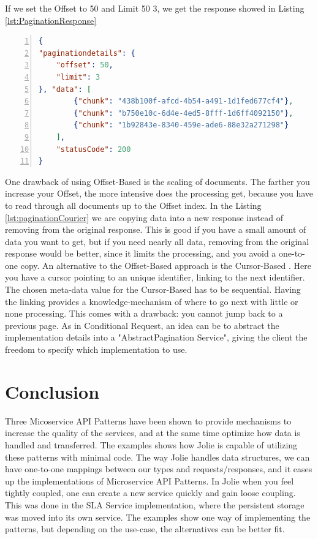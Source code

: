 \documentclass[12pt]{article}
\begin{document}
If we set the Offset to 50 and Limit 50 3, we get the response showed in Listing \ref{lst:PaginationResponse}

\begin{lstlisting}[caption=The response to the client based on Offset and Limit meta-data, 
    captionpos=b, language=json, label={lst:PaginationResponse}, numbers=left]
{
"paginationdetails": {
    "offset": 50,
    "limit": 3
}, "data": [
        {"chunk": "438b100f-afcd-4b54-a491-1d1fed677cf4"},
        {"chunk": "b750e10c-6d4e-4ed5-8fff-1d6ff4092150"},
        {"chunk": "1b92843e-8340-459e-ade6-88e32a271298"}
    ],
    "statusCode": 200
}
\end{lstlisting}

One drawback of using Offset-Based is the scaling of documents. The farther you increase your Offset, the more intensive does the processing get, because you have to read through all documents up to the Offset index. In the Listing \ref{lst:paginationCourier} we are copying data into a new response instead of removing from the original response. This is good if you have a small amount of data you want to get, but if you need nearly all data, removing from the original response would be better, since it limits the processing, and you avoid a one-to-one copy. An alternative to the Offset-Based approach is the Cursor-Based \cite{CursorBased}. Here you have a cursor pointing to an unique identifier, linking to the next identifier. The chosen meta-data value for the Cursor-Based has to be sequential. Having the linking provides a knowledge-mechanism of where to go next with little or none processing. This comes with a drawback: you cannot jump back to a previous page. As in Conditional Request, an idea can be to abstract the implementation details into a "AbstractPagination Service", giving the client the freedom to specify which implementation to use. 

\section{Conclusion}

Three Micoservice API Patterns have been shown to provide mechanisms to increase the quality of the services, and at the same time optimize how data is handled and transferred. The examples shows how Jolie is capable of utilizing these patterns with minimal code. The way Jolie handles data structures, we can have one-to-one mappings between our types and requests/responses, and it eases up the implementations of Microservice API Patterns. In Jolie when you feel tightly coupled, one can create a new service quickly and gain loose coupling. This was done in the SLA Service implementation, where the persistent storage was moved into its own service. The examples show one way of implementing the patterns, but depending on the use-case, the alternatives can be better fit.

\newpage


\end{document}
